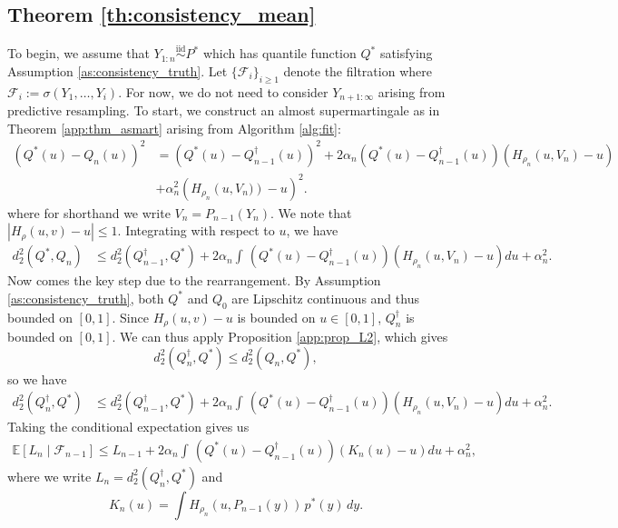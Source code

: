 \documentclass[11pt,a4paper]{article}
\newcommand{\iid}{\overset{\mathrm{iid}}{\sim}}
\newcommand{\E}{\mathbb{E}}
\begin{document}
\begin{appendices}
\subsection{Theorem \ref{th:consistency_mean}}
To begin, we assume that $Y_{1:n}\iid P^*$ which has quantile function $Q^*$ satisfying {Assumption \ref{as:consistency_truth}}. Let $\{\mathcal{F}_{i}\}_{i \geq 1}$ denote the filtration where $\mathcal{F}_i := \sigma\left(Y_1,\ldots,Y_i\right)$. For now, we do not need to consider $Y_{n+1:\infty}$ arising from predictive resampling. 
 To start, we construct an almost supermartingale  as in {Theorem \ref{app:thm_asmart}} arising from {Algorithm \ref{alg:fit}}:
\begin{align*}
     \left(Q^*(u) - Q_{n}(u) \right)^2 &= (Q^*(u) - Q^\dagger_{n-1}(u))^2 + 2\alpha_{n}(Q^*(u) - Q^\dagger_{n-1}(u))\left( H_{\rho_n}\left(u,V_n\right) - u\right) \\
     &+ \alpha_{n}^2\left(H_{\rho_n}\left(u,V_n)\right) - u\right)^2.
\end{align*}
where for shorthand we write $V_n = P_{n-1}(Y_{n})$. We note that $|H_\rho(u,v) - u| \leq 1$.
Integrating with respect to $u$, we have
\begin{align*}
     d_2^2\left(Q^*, Q_{n} \right) &\leq d_2^2(Q^{\dagger}_{n-1}, Q^* )+ 2\alpha_{n}\int \, (Q^*(u) - Q^\dagger_{n-1}(u))\left( H_{\rho_n}\left(u,V_n\right) - u\right)du + \alpha_{n }^2.
\end{align*}
Now comes the key step due to the rearrangement. By {Assumption \ref{as:consistency_truth}}, both $Q^*$ and $Q_0$ are Lipschitz continuous and thus bounded on $[0,1]$. Since $H_\rho(u,v) - u$ is bounded on $u \in [0,1]$, $Q_n^{\dagger}$ is bounded on $[0,1]$. We can thus apply {Proposition \ref{app:prop_L2}}, which gives
$$
d_2^2(Q_{n}^{\dagger},Q^*) \leq d_2^2(Q_{n},Q^*),
$$
so we have 
\begin{align*}
     d_2^2\left( Q^{\dagger}_{n},Q^* \right) &\leq d_2^2(Q^{\dagger}_{n-1},Q^* )+ 2\alpha_{n}\int \, (Q^*(u) - Q^\dagger_{n-1}(u))\left( H_{\rho_n}\left(u,V_n\right) - u\right)du + \alpha_{n}^2.
\end{align*}
Taking the conditional expectation gives us
\begin{align*}
   \E\left[L_{n} \mid \mathcal{F}_{n-1}\right]   \leq L_{n-1} + 2\alpha_{n}\int \, (Q^*(u) - Q^\dagger_{n-1}(u))\left(  K_{n}\left(u\right)-u\right)du + \alpha_{n}^2, 
\end{align*}
where we write $L_n = d_2^2(Q^{\dagger}_n, Q^*)$ and 
$$
K_n(u) = \int  H_{\rho_n}(u,P_{n-1}(y))\, p^*(y) \, dy.
$$
\end{appendices}
\end{document}
